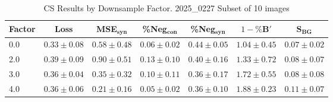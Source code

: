 


\begin{table}[h]
\centering
\small
\begin{tabular}{lcccccc}
\hline
Factor & Loss & MSE$_{\mathbf{syn}}$ & \%Neg$_{\mathbf{con}}$ & \%Neg$_{\mathbf{syn}}$ & $1-\%\mathbf{B}'$ & $\mathbf{S}_{\mathbf{BG}}$ \\
\hline
0.0 & $0.33 \pm 0.08$ & $0.58 \pm 0.48$ & $0.06 \pm 0.02$ & $0.44 \pm 0.05$ & $1.04 \pm 0.45$ & $0.07 \pm 0.02$ \\
2.0 & $0.39 \pm 0.09$ & $0.90 \pm 0.51$ & $0.13 \pm 0.10$ & $0.40 \pm 0.16$ & $1.33 \pm 0.72$ & $0.08 \pm 0.07$ \\
3.0 & $0.36 \pm 0.04$ & $0.35 \pm 0.32$ & $0.10 \pm 0.11$ & $0.36 \pm 0.17$ & $1.72 \pm 0.55$ & $0.08 \pm 0.08$ \\
4.0 & $0.36 \pm 0.06$ & $0.21 \pm 0.16$ & $0.05 \pm 0.02$ & $0.36 \pm 0.10$ & $1.88 \pm 0.23$ & $0.11 \pm 0.07$ \\
\hline
\end{tabular}
\caption{CS Results by Downsample Factor. 2025\_0227 Subset of 10 images}
\label{tab:downsample_cs}
\end{table}

